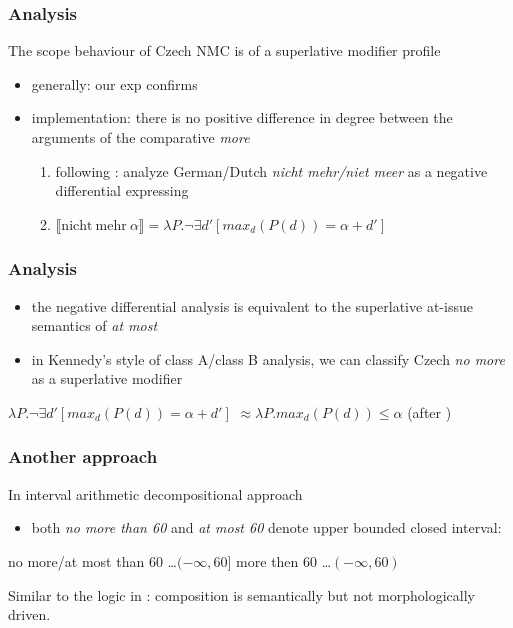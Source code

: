 \documentclass[10pt
]{beamer}
\newcommand{\sem}[1]{\llbracket{#1}\rrbracket}
\begin{document}
\begin{frame}
  \frametitle{Analysis}

  The scope behaviour of Czech NMC is of a superlative modifier profile
  
  \begin{itemize}
    \item generally: our exp confirms \cite{kennedy2015fregean}
    \item implementation:  there is no positive difference in degree between the arguments of the comparative \textit{more}
    
    \begin{enumerate}
      \item following \cite{nouwen2008upper}: analyze German/Dutch \textit{nicht mehr/niet meer} as a negative differential expressing  
      \item $\sem{\mathrm{nicht\ mehr\ }\alpha}=\lambda P.\neg \exists d'[max_d(P(d)) = \alpha + d']$ 
    \end{enumerate}

  \end{itemize}
  
\end{frame}

\begin{frame}
  \frametitle{Analysis}

  \begin{itemize}
    \item the negative differential analysis is equivalent to the superlative at-issue semantics of \textit{at most}
    \item in Kennedy's style of class A/class B analysis, we can classify Czech \textit{no more} as a superlative modifier
  \end{itemize}

  \pex \a $\lambda P.\neg \exists d'[max_d(P(d)) = \alpha + d']$
  \a $\approx \lambda P.max_d(P(d)) \leq \alpha$ \hfill (after \cite{kennedy2015fregean})
  \xe

\end{frame}

\begin{frame}
  \frametitle{Another approach}

  In \cite{zhang2021semantics} interval arithmetic decompositional approach

  \begin{itemize}
    \item both \textit{no more than 60} and \textit{at most 60} denote upper bounded closed interval:
  \end{itemize}
  
  \pex \a no more/at most than 60 \ldots $(-\infty, 60]$
  \a more then 60 \ldots $(-\infty, 60)$
  \xe

  Similar to the logic in \cite{kennedy2015fregean}: composition is semantically but not morphologically driven.


\end{frame}
\end{document}
